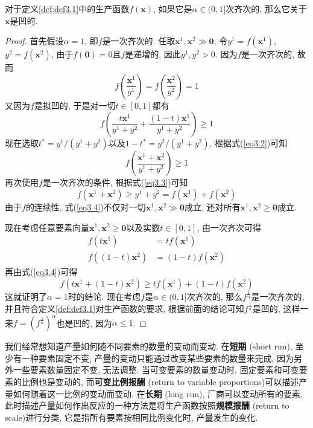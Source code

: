 \documentclass[cn, 12pt, math=mtpro2, bibstyle=apa, blue]{elegantbook}
\newcommand{\x}{\mathbf{x}}
\begin{document}
\begin{theorem}
  对于定义\ref{def:def3.1}中的生产函数$f(\x)$, 如果它是$\alpha\in (0,1]$次齐次的, 那么它关于$\x$是凹的.
\end{theorem}
\begin{proof}
  首先假设$\alpha=1$, 即$f$是一次齐次的. 任取$\x^1,\x^2\gg\mathbf{0}$, 令$y^1=f(\x^1)$, $y^2=f(\x^2)$, 由于$f(\mathbf{0})=0$且$f$是递增的, 因此$y^1,y^2>0$. 因为$f$是一次齐次的, 故而
  $$f\left(\frac{\x^1}{y^1}\right)=f\left(\frac{\x^2}{y^2}\right)=1$$
  又因为$f$是拟凹的, 于是对一切$t\in[0,1]$都有
  \begin{equation}\label{eq3.2}
    f\left(\frac{t\x^1}{y^1+y^2}+\frac{(1-t)\x^1}{y^1+y^2}\right)\geq1
  \end{equation}
  现在选取$t^\ast=y^1/(y^1+y^2)$以及$1-t^\ast=y^2/(y^1+y^2)$, 根据式(\ref{eq3.2})可知
  \begin{equation}\label{eq3.3}
    f\left(\frac{\x^1+\x^2}{y^1+y^2}\right)\ge1
  \end{equation}
  再次使用$f$是一次齐次的条件, 根据式(\ref{eq3.3})可知
  \begin{equation}\label{eq3.4}
    f(\x^1+\x^2)\geq y^1+y^2=f(\x^1)+f(\x^2)
  \end{equation}
  由于$f$的连续性, 式(\ref{eq3.4})不仅对一切$\x^1,\x^2\gg\mathbf{0}$成立, 还对所有$\x^1,\x^2\ge\mathbf{0}$成立.

  现在考虑任意要素向量$\x^1,\x^2\ge\mathbf{0}$以及实数$t\in[0,1]$, 由一次齐次可得
  \begin{align*}
  f(t\x^1)&=tf(\x^1) \\
  f((1-t)\x^2)&=(1-t)f(\x^2)
  \end{align*}
  再由式(\ref{eq3.4})可得
  $$f(t\x^1+(1-t)\x^2)\geq tf(\x^1)+(1-t)f(\x^2)$$
  这就证明了$\alpha=1$时的结论. 现在考虑$f$是$\alpha\in (0,1]$次齐次的, 那么$f^{\frac{1}{\alpha}}$是一次齐次的, 并且符合定义\ref{def:def3.1}对生产函数的要求, 根据前面的结论可知$f^{\frac{1}{\alpha}}$是凹的, 这样一来$f=(f^{\frac{1}{\alpha}})^\alpha$也是凹的, 因为$\alpha\leq1$.
\end{proof}

我们经常想知道产量如何随不同要素的数量的变动而变动. 在\textbf{短期} (short run), 至少有一种要素固定不变, 产量的变动只能通过改变某些要素的数量来完成, 因为另外一些要素数量固定不变, 无法调整. 当可变要素的数量变动时, 固定要素和可变要素的比例也是变动的, 而\textbf{可变比例报酬} (return to variable proportions)可以描述产量如何随着这一比例的变动而变动. 在\textbf{长期} (long run), 厂商可以变动所有的要素, 此时描述产量如何作出反应的一种方法是将生产函数按照\textbf{规模报酬} (return to scale)进行分类, 它是指所有要素按相同比例变化时, 产量发生的变化.
\end{document}
